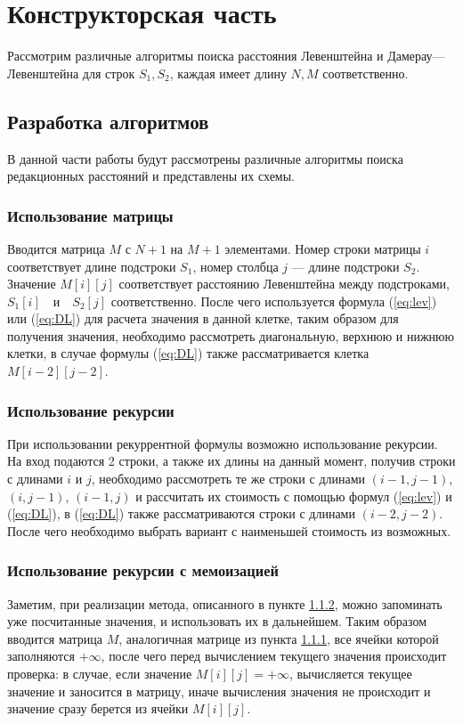 \chapter{Конструкторская часть}

Рассмотрим различные алгоритмы поиска расстояния Левенштейна и Дамерау---Левенштейна для строк $S_{1},S_{2}$, каждая имеет
длину $N , M$ соответственно.



\section{Разработка алгоритмов}
В данной части работы будут рассмотрены различные 
алгоритмы поиска редакционных расстояний и представлены их схемы.

\subsection{Использование матрицы}
\label{subsec:matrix_math_desc}
Вводится матрица $M$ с $N + 1$ на $M + 1$ элементами. Номер строки матрицы $i$ соответствует длине подстроки $S_{1}$, номер столбца $j$ --- длине подстроки $S_{2}$.
Значение $M[i][j]$ соответствует расстоянию Левенштейна между подстроками, $S_{1}[i] \quad \text{и} \quad S_{2}[j]$ соответственно. После чего используется формула (\ref{eq:lev}) или
(\ref{eq:DL}) для расчета значения в данной клетке, таким образом для получения значения, необходимо рассмотреть диагональную, верхнюю и нижнюю клетки, в случае формулы (\ref{eq:DL}) также рассматривается клетка $M[i-2][j-2]$.


\subsection{Использование рекурсии}
\label{subsec:recurse_math_desc}
При использовании рекуррентной формулы возможно использование рекурсии.
На вход подаются 2 строки, а также их длины на данный момент, получив строки с длинами $i$ и $j$, необходимо рассмотреть 
те же строки с длинами $(i-1,j-1)$, $(i,j-1)$, $(i-1,j)$ и рассчитать их стоимость  с помощью формул (\ref{eq:lev}) и (\ref{eq:DL}), в (\ref{eq:DL}) также рассматриваются строки с длинами $(i-2,j-2)$. 
После чего необходимо выбрать вариант с наименьшей стоимость из возможных.

\subsection{Использование рекурсии с мемоизацией}
\label{subec:memorysation_descr}
Заметим, при реализации метода, описанного в пункте \ref{subsec:recurse_math_desc}, можно запоминать уже посчитанные значения, и использовать их в дальнейшем.
Таким образом вводится матрица $M$, аналогичная матрице из пункта \ref{subsec:matrix_math_desc}, все ячейки которой заполняются $+\infty$, после чего
перед вычислением текущего значения происходит проверка: в случае, если значение $M[i][j] = +\infty$, вычисляется текущее значение и заносится в матрицу, иначе
вычисления значения не происходит и значение сразу берется из ячейки $M[i][j]$.

